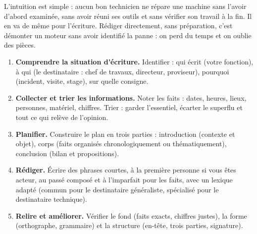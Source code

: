 \documentclass[11pt]{article}
\begin{document}
L'intuition est simple : aucun bon technicien ne répare une machine sans l'avoir d'abord examinée, sans avoir réuni ses outils et sans vérifier son travail à la fin. Il en va de même pour l'écriture. Rédiger directement, sans préparation, c'est démonter un moteur sans avoir identifié la panne : on perd du temps et on oublie des pièces.

\begin{methode}
\begin{enumerate}
\item \textbf{Comprendre la situation d'écriture.} Identifier : qui écrit (votre fonction), à qui (le destinataire : chef de travaux, directeur, proviseur), pourquoi (incident, visite, stage), sur quelle consigne.
\item \textbf{Collecter et trier les informations.} Noter les faits : dates, heures, lieux, personnes, matériel, chiffres. Trier : garder l'essentiel, écarter le superflu et tout ce qui relève de l'opinion.
\item \textbf{Planifier.} Construire le plan en trois parties : introduction (contexte et objet), corps (faits organisés chronologiquement ou thématiquement), conclusion (bilan et propositions).
\item \textbf{Rédiger.} Écrire des phrases courtes, à la première personne si vous êtes acteur, au passé composé et à l'imparfait pour les faits, avec un lexique adapté (commun pour le destinataire généraliste, spécialisé pour le destinataire technique).
\item \textbf{Relire et améliorer.} Vérifier le fond (faits exacts, chiffres justes), la forme (orthographe, grammaire) et la structure (en-tête, trois parties, signature).
\end{enumerate}
\end{methode}
\end{document}
